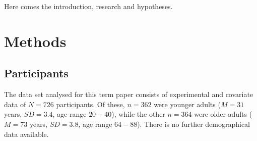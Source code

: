 
		
	
	

	
		\maketitle
	
		Here comes the introduction, research and hypotheses. 	
		
		
		\section{Methods}
		
		\subsection{Participants}
		The data set analysed for this term paper consists of experimental and covariate data of $N = 726$ participants. Of these, $n=362$ were younger adults ($M = 31$ years, $SD = 3.4$, age range $20-40$), while the other $n=364$ were older adults ($M = 73$ years, $SD = 3.8$, age range $64-88$). There is no further demographical data available. 
		

